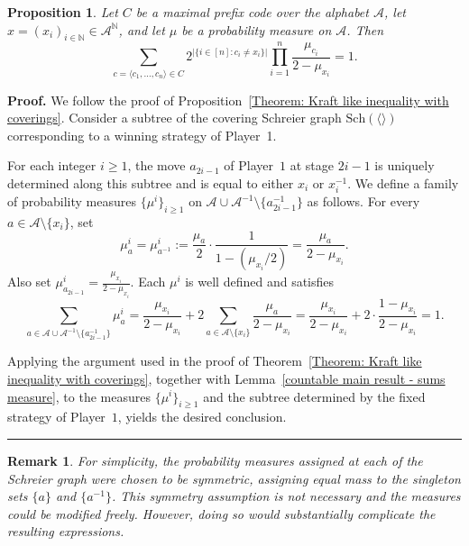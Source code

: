 \documentclass[a4,12pt]{article}%
\newtheorem{proposition}[theorem]{Proposition}
\newtheorem{remark}[theorem]{Remark}
\newenvironment{proof}[1][Proof]{\textbf{#1.} }{\ \rule{0.5em}{0.5em}}
\begin{document}
\begin{proposition}
Let $C$ be a maximal prefix code over the alphabet $\mathcal{A}$, let
$x = (x_i)_{i \in \mathbb{N}} \in \mathcal{A}^{\mathbb{N}}$, and let $\mu$ be a probability measure on $\mathcal{A}$. Then
\[
\sum_{c = \langle c_1, \ldots, c_n \rangle \in C}
2^{\lvert \{ i \in [n] : c_i \neq x_i \} \rvert}
\prod_{i=1}^{n} \frac{\mu_{c_i}}{2 - \mu_{x_i}}
= 1.
\]
\end{proposition}
\begin{proof}
We follow the proof of Proposition~\ref{Theorem: Kraft like inequality with coverings}. Consider a subtree of the covering Schreier graph $\mathrm{Sch}(\langle\rangle)$ corresponding to a winning strategy of Player~1. 

For each integer $i \ge 1$, the move $a_{2i-1}$ of Player~$1$ at stage $2i-1$ is uniquely determined along this subtree and is equal to either $x_i$ or $x_i^{-1}$. We define a family of probability measures $\{\mu^i\}_{i \ge 1}$ on $\mathcal{A} \cup \mathcal{A}^{-1} \setminus \{a_{2i-1}^{-1}\}$ as follows. For every $a \in \mathcal{A} \setminus \{x_i\}$, set
\[
\mu^i_a = \mu^i_{a^{-1}}
:= \frac{\mu_a}{2} \cdot \frac{1}{1 - (\mu_{x_i}/2)}
= \frac{\mu_a}{2 - \mu_{x_i}}.
\]
Also set $\mu^i_{a_{2i-1}} = \frac{\mu_{x_i}}{2 - \mu_{x_i}}$. Each $\mu^i$ is well defined and satisfies
\[
\sum_{a \in \mathcal{A} \cup \mathcal{A}^{-1} \setminus \{a_{2i-1}^{-1}\}} \mu^i_a =  \frac{\mu_{x_i}}{2 - \mu_{x_i}}+ 2\sum_{a \in \mathcal{A} \setminus \{x_i\}}   \frac{\mu_a}{2 - \mu_{x_i}} =\frac{\mu_{x_i}}{2 - \mu_{x_i}}+ 2\cdot \frac{1-\mu_{x_i}}{2 - \mu_{x_i}}= 1.
\]

Applying the argument used in the proof of Theorem~\ref{Theorem: Kraft like inequality with coverings}, together with Lemma~\ref{countable main result - sums measure}, to the measures $\{\mu^i\}_{i \ge 1}$ and the subtree determined by the fixed strategy of Player~$1$, yields the desired conclusion.
\end{proof}
\begin{remark}
For simplicity, the probability measures assigned at each  of the Schreier graph were chosen to be symmetric, assigning equal mass to the singleton sets $\{a\}$ and $\{a^{-1}\}$. This symmetry assumption is not necessary and the measures could be modified freely. However, doing so would substantially complicate the resulting expressions.
\end{remark}
\end{document}
